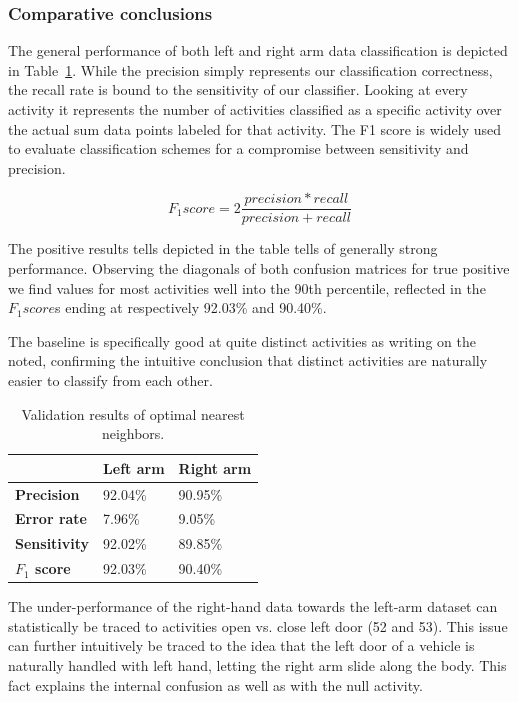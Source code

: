 \documentclass{sig-alternate}
\begin{document}
\subsubsection{Comparative conclusions}
The general performance of both left and right arm data classification is depicted in Table~\ref{tab:comp_left_right}. While the precision simply represents our classification correctness, the recall rate is bound to the sensitivity of our classifier. Looking at every activity it represents the number of activities classified as a specific activity over the actual sum data points labeled for that activity. The F1 score is widely used to evaluate classification schemes for a compromise between sensitivity and precision.

\begin{equation}
F_1 score = 2 \frac{precision * recall}{precision + recall}
\end{equation}

The positive results tells depicted in the table tells of generally strong performance. Observing the diagonals of both confusion matrices for true positive we find values for most activities well into the 90th percentile, reflected in the $F_1 score$s ending at respectively 92.03\% and 90.40\%.

The baseline is specifically good at quite distinct activities as writing on the noted, confirming the intuitive conclusion that distinct activities are naturally easier to classify from each other.

\begin{table}[bp]
\centering
\caption{Validation results of optimal nearest neighbors.}
\begin{tabular}{|l|l|l|}
\hline
           							&\textbf{Left arm} 			&\textbf{Right arm}		\\ \hline
\textbf{Precision}  				& 92.04\% 		 			& 90.95\%					\\ \hline
\textbf{Error rate} 				& 7.96\%		 				& 9.05\%					\\ \hline
\textbf{Sensitivity}  				& 92.02\%		 				& 89.85\%					\\ \hline
\textbf{$F_{1}$ score}  			& 92.03\%		 				& 90.40\%					\\ \hline

\end{tabular}
\label{tab:comp_left_right}
\end{table}

The under-performance of the right-hand data towards the left-arm dataset can statistically be traced to activities open vs. close left door (52 and 53). This issue can further intuitively be traced to the idea that the left door of a vehicle is naturally handled with left hand, letting the right arm slide along the body. This fact explains the internal confusion as well as with the null activity.
\end{document}
